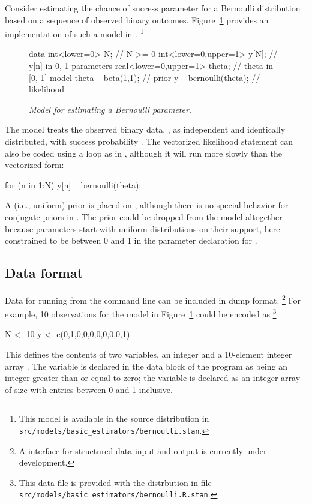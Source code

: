 \documentclass[article]{jss}
\begin{document}
Consider estimating the chance of success parameter for a Bernoulli
distribution based on a sequence of observed binary outcomes.  
Figure~\ref{bernoulli-model.fig} provides an implementation of such a
model in .%
%
\footnote{This model is available in the  source
  distribution in \nolinkurl{src/models/basic\_estimators/bernoulli.stan}.}
%
\begin{figure}
\begin{Code}
data {
  int<lower=0> N;                  // N >= 0
  int<lower=0,upper=1> y[N];       // y[n] in { 0, 1 }
}
parameters {
  real<lower=0,upper=1> theta;     // theta in [0, 1]
}
model {
  theta ~ beta(1,1);               // prior
  y ~ bernoulli(theta);            // likelihood
}
\end{Code}
\caption{\it Model for estimating a Bernoulli parameter.}\label{bernoulli-model.fig}
\end{figure}
%
The model treats the observed binary data, , as
independent and identically distributed, with success probability
.  The vectorized likelihood statement can also be coded
using a loop as in , although it will run more slowly than the
vectorized form:
%
\begin{Code}
for (n in 1:N)
  y[n] ~ bernoulli(theta);
\end{Code}
%
A  (i.e., uniform) prior is placed on ,
although there is no special behavior for conjugate priors in
.  The prior could be dropped from the model altogether
because parameters start with uniform distributions on their support,
here constrained to be between 0 and 1 in the parameter declaration
for .  



\subsection{Data format}

Data for running  from the command line can be included
in  dump format.%
%
\footnote{A  interface for structured data input and output is
  currently under development.}
%
For example, 10 observations for the
model in Figure~\ref{bernoulli-model.fig} could be encoded as%
%
\footnote{This data
file is provided with the  distrbution in file
\nolinkurl{src/models/basic\_estimators/bernoulli.R.stan}.}
%
\begin{Code}
N <- 10
y <- c(0,1,0,0,0,0,0,0,0,1)
\end{Code}
%
This defines the contents of two variables, an integer  and a
10-element integer array .  The variable  is declared
in the data block of the program as being an integer greater than or
equal to zero;  the variable  is declared as an integer array of size
 with entries between 0 and 1 inclusive.
\end{document}
